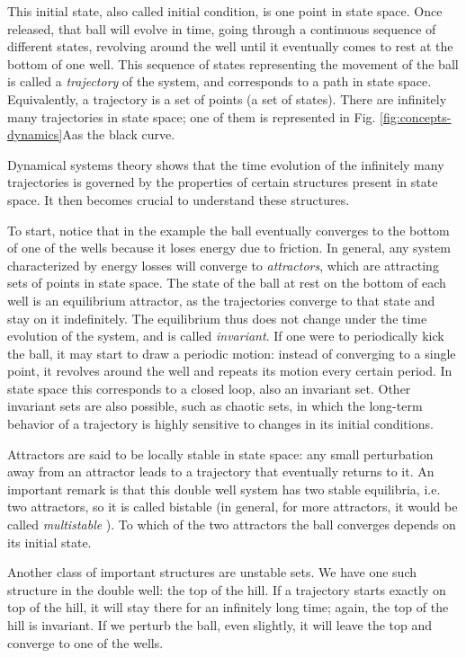 This initial state, also called initial condition, is one point in state space. Once released, that ball will evolve in time, going through a continuous sequence of different states, revolving around the well until it eventually comes to rest at the bottom of one well. This sequence of states representing the movement of the ball is called a \textit{trajectory} of the system, and corresponds to a path in state space. Equivalently, a trajectory is a set of points (a set of states). There are infinitely many trajectories in state space; one of them is represented in Fig. \ref{fig:concepts-dynamics}A\supprime as the black curve.

Dynamical systems theory shows that the time evolution of the infinitely many trajectories is governed by the properties of certain structures present in state space. It then becomes crucial to understand these structures.

To start, notice that in the example the ball eventually converges to the bottom of one of the wells because it loses energy due to friction. In general, any system characterized by energy losses will converge to \textit{attractors}, which are attracting sets of points in state space. The state of the ball at rest on the bottom of each well is an equilibrium attractor, as the trajectories converge to that state and stay on it indefinitely. The equilibrium thus does not change under the time evolution of the system, and is called \textit{invariant}. If one were to periodically kick the ball, it may start to draw a periodic motion: instead of converging to a single point, it revolves around the well and repeats its motion every certain period. In state space this corresponds to a closed loop, also an invariant set. Other invariant sets are also possible, such as chaotic sets, in which the long-term behavior of a trajectory is highly sensitive to changes in its initial conditions.

Attractors are said to be locally stable in state space: any small perturbation away from an attractor leads to a trajectory that eventually returns to it. An important remark is that this double well system has two stable equilibria, i.e. two attractors, so it is called bistable (in general, for more attractors, it would be called \textit{multistable} \cite{feudel2008complex, feudel2018multistability}). To which of the two attractors the ball converges depends on its initial state. 

Another class of important structures are unstable sets. We have one such structure in the double well: the top of the hill. If a trajectory starts exactly on top of the hill, it will stay there for an infinitely long time; again, the top of the hill is invariant. If we perturb the ball, even slightly, it will leave the top and converge to one of the wells. 

